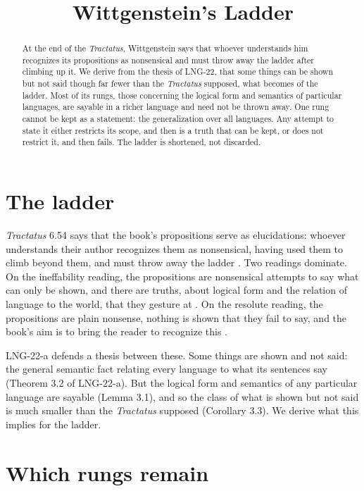 \documentclass{situationist-preprint}
\title{Wittgenstein's Ladder}
\begin{document}
\maketitle

\begin{abstract}
At the end of the \emph{Tractatus}, Wittgenstein says that whoever understands him recognizes its propositions as nonsensical and must throw away the ladder after climbing up it. We derive from the thesis of LNG-22, that some things can be shown but not said though far fewer than the \emph{Tractatus} supposed, what becomes of the ladder. Most of its rungs, those concerning the logical form and semantics of particular languages, are sayable in a richer language and need not be thrown away. One rung cannot be kept as a statement: the generalization over all languages. Any attempt to state it either restricts its scope, and then is a truth that can be kept, or does not restrict it, and then fails. The ladder is shortened, not discarded.
\end{abstract}

\section{The ladder}

\emph{Tractatus} 6.54 says that the book's propositions serve as elucidations: whoever understands their author recognizes them as nonsensical, having used them to climb beyond them, and must throw away the ladder \citep{Wittgenstein1922}. Two readings dominate. On the ineffability reading, the propositions are nonsensical attempts to say what can only be shown, and there are truths, about logical form and the relation of language to the world, that they gesture at \citep{Hacker2000}. On the resolute reading, the propositions are plain nonsense, nothing is shown that they fail to say, and the book's aim is to bring the reader to recognize this \citep{Diamond1988}.

LNG-22-a defends a thesis between these. Some things are shown and not said: the general semantic fact relating every language to what its sentences say (Theorem 3.2 of LNG-22-a). But the logical form and semantics of any particular language are sayable (Lemma 3.1), and so the class of what is shown but not said is much smaller than the \emph{Tractatus} supposed (Corollary 3.3). We derive what this implies for the ladder.

\section{Which rungs remain}
\end{document}
